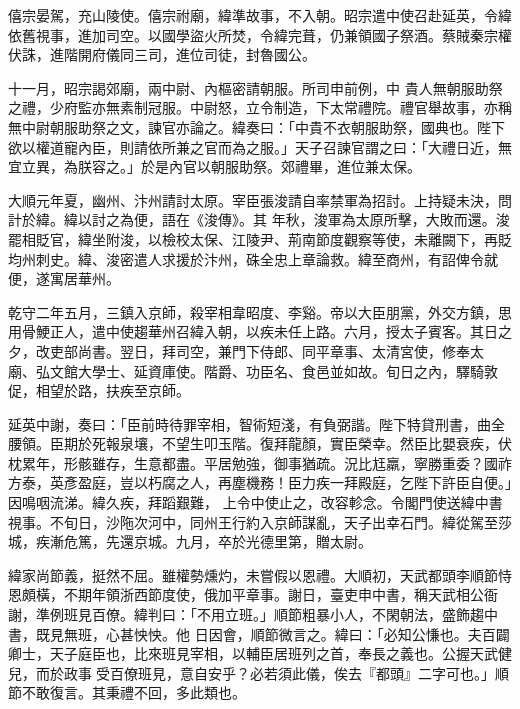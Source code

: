 \begin{pinyinscope}
 僖宗晏駕，充山陵使。僖宗祔廟，緯準故事，不入朝。昭宗遣中使召赴延英，令緯依舊視事，進加司空。以國學盜火所焚，令緯完葺，仍兼領國子祭酒。蔡賊秦宗權伏誅，進階開府儀同三司，進位司徒，封魯國公。



 十一月，昭宗謁郊廟，兩中尉、內樞密請朝服。所司申前例，中
 貴人無朝服助祭之禮，少府監亦無素制冠服。中尉怒，立令制造，下太常禮院。禮官舉故事，亦稱無中尉朝服助祭之文，諫官亦論之。緯奏曰：「中貴不衣朝服助祭，國典也。陛下欲以權道寵內臣，則請依所兼之官而為之服。」天子召諫官謂之曰：「大禮日近，無宜立異，為朕容之。」於是內官以朝服助祭。郊禮畢，進位兼太保。



 大順元年夏，幽州、汴州請討太原。宰臣張浚請自率禁軍為招討。上持疑未決，問計於緯。緯以討之為便，語在《浚傳》。其
 年秋，浚軍為太原所擊，大敗而還。浚罷相貶官，緯坐附浚，以檢校太保、江陵尹、荊南節度觀察等使，未離闕下，再貶均州刺史。緯、浚密遣人求援於汴州，硃全忠上章論救。緯至商州，有詔俾令就便，遂寓居華州。



 乾守二年五月，三鎮入京師，殺宰相韋昭度、李谿。帝以大臣朋黨，外交方鎮，思用骨鯁正人，遣中使趨華州召緯入朝，以疾未任上路。六月，授太子賓客。其日之夕，改吏部尚書。翌日，拜司空，兼門下侍郎、同平章事、太清宮使，修奉太
 廟、弘文館大學士、延資庫使。階爵、功臣名、食邑並如故。旬日之內，驛騎敦促，相望於路，扶疾至京師。



 延英中謝，奏曰：「臣前時待罪宰相，智術短淺，有負弼諧。陛下特貸刑書，曲全腰領。臣期於死報泉壤，不望生叩玉階。復拜龍顏，實臣榮幸。然臣比嬰衰疾，伏枕累年，形骸雖存，生意都盡。平居勉強，御事猶疏。況比尪羸，寧勝重委？國祚方泰，英彥盈庭，豈以朽腐之人，再塵機務！臣力疾一拜殿庭，乞陛下許臣自便。」因鳴咽流涕。緯久疾，拜蹈艱難，
 上令中使止之，改容軫念。令閣門使送緯中書視事。不旬日，沙陁次河中，同州王行約入京師謀亂，天子出幸石門。緯從駕至莎城，疾漸危篤，先還京城。九月，卒於光德里第，贈太尉。



 緯家尚節義，挺然不屈。雖權勢燻灼，未嘗假以恩禮。大順初，天武都頭李順節恃恩頗橫，不期年領浙西節度使，俄加平章事。謝日，臺吏申中書，稱天武相公衙謝，準例班見百僚。緯判曰：「不用立班。」順節粗暴小人，不閑朝法，盛飾趨中書，既見無班，心甚怏怏。他
 日因會，順節微言之。緯曰：「必知公慊也。夫百闢卿士，天子庭臣也，比來班見宰相，以輔臣居班列之首，奉長之義也。公握天武健兒，而於政事受百僚班見，意自安乎？必若須此儀，俟去『都頭』二字可也。」順節不敢復言。其秉禮不回，多此類也。




\end{pinyinscope}
